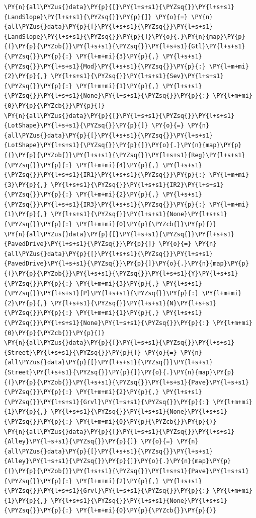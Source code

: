\documentclass[no-math]{YangThesis}
\begin{document}
\begin{tcolorbox}[breakable, size=fbox, boxrule=1pt, pad at break*=1mm,colback=cellbackground, colframe=cellborder]
\begin{Verbatim}[commandchars=\\\{\}]
\PY{n}{all\PYZus{}data}\PY{p}{[}\PY{l+s+s1}{\PYZsq{}}\PY{l+s+s1}{LandSlope}\PY{l+s+s1}{\PYZsq{}}\PY{p}{]} \PY{o}{=} \PY{n}{all\PYZus{}data}\PY{p}{[}\PY{l+s+s1}{\PYZsq{}}\PY{l+s+s1}{LandSlope}\PY{l+s+s1}{\PYZsq{}}\PY{p}{]}\PY{o}{.}\PY{n}{map}\PY{p}{(}\PY{p}{\PYZob{}}\PY{l+s+s1}{\PYZsq{}}\PY{l+s+s1}{Gtl}\PY{l+s+s1}{\PYZsq{}}\PY{p}{:} \PY{l+m+mi}{3}\PY{p}{,} \PY{l+s+s1}{\PYZsq{}}\PY{l+s+s1}{Mod}\PY{l+s+s1}{\PYZsq{}}\PY{p}{:} \PY{l+m+mi}{2}\PY{p}{,} \PY{l+s+s1}{\PYZsq{}}\PY{l+s+s1}{Sev}\PY{l+s+s1}{\PYZsq{}}\PY{p}{:} \PY{l+m+mi}{1}\PY{p}{,} \PY{l+s+s1}{\PYZsq{}}\PY{l+s+s1}{None}\PY{l+s+s1}{\PYZsq{}}\PY{p}{:} \PY{l+m+mi}{0}\PY{p}{\PYZcb{}}\PY{p}{)}
\PY{n}{all\PYZus{}data}\PY{p}{[}\PY{l+s+s1}{\PYZsq{}}\PY{l+s+s1}{LotShape}\PY{l+s+s1}{\PYZsq{}}\PY{p}{]} \PY{o}{=} \PY{n}{all\PYZus{}data}\PY{p}{[}\PY{l+s+s1}{\PYZsq{}}\PY{l+s+s1}{LotShape}\PY{l+s+s1}{\PYZsq{}}\PY{p}{]}\PY{o}{.}\PY{n}{map}\PY{p}{(}\PY{p}{\PYZob{}}\PY{l+s+s1}{\PYZsq{}}\PY{l+s+s1}{Reg}\PY{l+s+s1}{\PYZsq{}}\PY{p}{:} \PY{l+m+mi}{4}\PY{p}{,} \PY{l+s+s1}{\PYZsq{}}\PY{l+s+s1}{IR1}\PY{l+s+s1}{\PYZsq{}}\PY{p}{:} \PY{l+m+mi}{3}\PY{p}{,} \PY{l+s+s1}{\PYZsq{}}\PY{l+s+s1}{IR2}\PY{l+s+s1}{\PYZsq{}}\PY{p}{:} \PY{l+m+mi}{2}\PY{p}{,} \PY{l+s+s1}{\PYZsq{}}\PY{l+s+s1}{IR3}\PY{l+s+s1}{\PYZsq{}}\PY{p}{:} \PY{l+m+mi}{1}\PY{p}{,} \PY{l+s+s1}{\PYZsq{}}\PY{l+s+s1}{None}\PY{l+s+s1}{\PYZsq{}}\PY{p}{:} \PY{l+m+mi}{0}\PY{p}{\PYZcb{}}\PY{p}{)}
\PY{n}{all\PYZus{}data}\PY{p}{[}\PY{l+s+s1}{\PYZsq{}}\PY{l+s+s1}{PavedDrive}\PY{l+s+s1}{\PYZsq{}}\PY{p}{]} \PY{o}{=} \PY{n}{all\PYZus{}data}\PY{p}{[}\PY{l+s+s1}{\PYZsq{}}\PY{l+s+s1}{PavedDrive}\PY{l+s+s1}{\PYZsq{}}\PY{p}{]}\PY{o}{.}\PY{n}{map}\PY{p}{(}\PY{p}{\PYZob{}}\PY{l+s+s1}{\PYZsq{}}\PY{l+s+s1}{Y}\PY{l+s+s1}{\PYZsq{}}\PY{p}{:} \PY{l+m+mi}{3}\PY{p}{,} \PY{l+s+s1}{\PYZsq{}}\PY{l+s+s1}{P}\PY{l+s+s1}{\PYZsq{}}\PY{p}{:} \PY{l+m+mi}{2}\PY{p}{,} \PY{l+s+s1}{\PYZsq{}}\PY{l+s+s1}{N}\PY{l+s+s1}{\PYZsq{}}\PY{p}{:} \PY{l+m+mi}{1}\PY{p}{,} \PY{l+s+s1}{\PYZsq{}}\PY{l+s+s1}{None}\PY{l+s+s1}{\PYZsq{}}\PY{p}{:} \PY{l+m+mi}{0}\PY{p}{\PYZcb{}}\PY{p}{)}
\PY{n}{all\PYZus{}data}\PY{p}{[}\PY{l+s+s1}{\PYZsq{}}\PY{l+s+s1}{Street}\PY{l+s+s1}{\PYZsq{}}\PY{p}{]} \PY{o}{=} \PY{n}{all\PYZus{}data}\PY{p}{[}\PY{l+s+s1}{\PYZsq{}}\PY{l+s+s1}{Street}\PY{l+s+s1}{\PYZsq{}}\PY{p}{]}\PY{o}{.}\PY{n}{map}\PY{p}{(}\PY{p}{\PYZob{}}\PY{l+s+s1}{\PYZsq{}}\PY{l+s+s1}{Pave}\PY{l+s+s1}{\PYZsq{}}\PY{p}{:} \PY{l+m+mi}{2}\PY{p}{,} \PY{l+s+s1}{\PYZsq{}}\PY{l+s+s1}{Grvl}\PY{l+s+s1}{\PYZsq{}}\PY{p}{:} \PY{l+m+mi}{1}\PY{p}{,} \PY{l+s+s1}{\PYZsq{}}\PY{l+s+s1}{None}\PY{l+s+s1}{\PYZsq{}}\PY{p}{:} \PY{l+m+mi}{0}\PY{p}{\PYZcb{}}\PY{p}{)}
\PY{n}{all\PYZus{}data}\PY{p}{[}\PY{l+s+s1}{\PYZsq{}}\PY{l+s+s1}{Alley}\PY{l+s+s1}{\PYZsq{}}\PY{p}{]} \PY{o}{=} \PY{n}{all\PYZus{}data}\PY{p}{[}\PY{l+s+s1}{\PYZsq{}}\PY{l+s+s1}{Alley}\PY{l+s+s1}{\PYZsq{}}\PY{p}{]}\PY{o}{.}\PY{n}{map}\PY{p}{(}\PY{p}{\PYZob{}}\PY{l+s+s1}{\PYZsq{}}\PY{l+s+s1}{Pave}\PY{l+s+s1}{\PYZsq{}}\PY{p}{:} \PY{l+m+mi}{2}\PY{p}{,} \PY{l+s+s1}{\PYZsq{}}\PY{l+s+s1}{Grvl}\PY{l+s+s1}{\PYZsq{}}\PY{p}{:} \PY{l+m+mi}{1}\PY{p}{,} \PY{l+s+s1}{\PYZsq{}}\PY{l+s+s1}{None}\PY{l+s+s1}{\PYZsq{}}\PY{p}{:} \PY{l+m+mi}{0}\PY{p}{\PYZcb{}}\PY{p}{)}

\end{Verbatim}
\end{tcolorbox}
\end{document}
